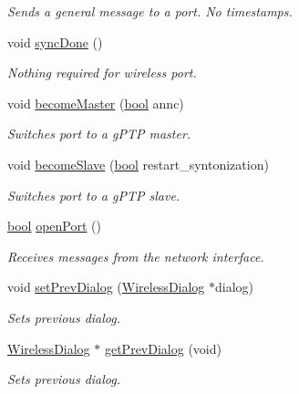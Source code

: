 \begin{DoxyCompactItemize}
\begin{DoxyCompactList}\small\item\em Sends a general message to a port. No timestamps. \end{DoxyCompactList}\item 
void \hyperlink{class_wireless_port_a802e021799f3f84c0bb06523a58f133b}{sync\+Done} ()
\begin{DoxyCompactList}\small\item\em Nothing required for wireless port. \end{DoxyCompactList}\item 
void \hyperlink{class_wireless_port_af952d115c5f8260d7c0006e2236ef6e6}{become\+Master} (\hyperlink{avb__gptp_8h_af6a258d8f3ee5206d682d799316314b1}{bool} annc)
\begin{DoxyCompactList}\small\item\em Switches port to a g\+P\+TP master. \end{DoxyCompactList}\item 
void \hyperlink{class_wireless_port_aa460e91a1efda3acef0e0ef519fee240}{become\+Slave} (\hyperlink{avb__gptp_8h_af6a258d8f3ee5206d682d799316314b1}{bool} restart\+\_\+syntonization)
\begin{DoxyCompactList}\small\item\em Switches port to a g\+P\+TP slave. \end{DoxyCompactList}\item 
\hyperlink{avb__gptp_8h_af6a258d8f3ee5206d682d799316314b1}{bool} \hyperlink{class_wireless_port_ac5c36d6d3f4bfbb168f215ace60b4f74}{open\+Port} ()
\begin{DoxyCompactList}\small\item\em Receives messages from the network interface. \end{DoxyCompactList}\item 
void \hyperlink{class_wireless_port_a30565b46f08e3140cfd988e7dab46589}{set\+Prev\+Dialog} (\hyperlink{class_wireless_dialog}{Wireless\+Dialog} $\ast$dialog)
\begin{DoxyCompactList}\small\item\em Sets previous dialog. \end{DoxyCompactList}\item 
\hyperlink{class_wireless_dialog}{Wireless\+Dialog} $\ast$ \hyperlink{class_wireless_port_a93390615d971208a624aa77a494c72ce}{get\+Prev\+Dialog} (void)
\begin{DoxyCompactList}\small\item\em Sets previous dialog. \end{DoxyCompactList}\item 

\end{DoxyCompactItemize}
